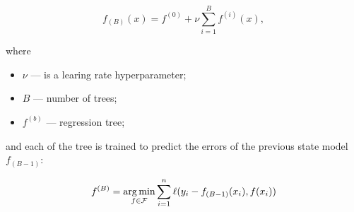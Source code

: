 \begin{equation}
    f_{(B)}(x) = f^{(0)} + \nu\sum\limits_{i=1}^{B}{f^{(i)}(x)},
\end{equation}

where

\begin{itemize}
    \item \(\nu\) --- is a learing rate hyperparameter;
    \item \(B\) --- number of trees;
    \item \(f^{(b)}\) --- regression tree;
\end{itemize}

and each of the tree is trained to predict the errors of the previous state model \(f_{(B-1)}\):

\begin{equation}
    f^{(B)} = \operatorname*{arg\,min}\limits_{f\in\mathcal{F}}{\sum_{i=1}^{n}{\ell(y_i - f_{(B-1)}(x_i), f(x_i))}}
\end{equation}







